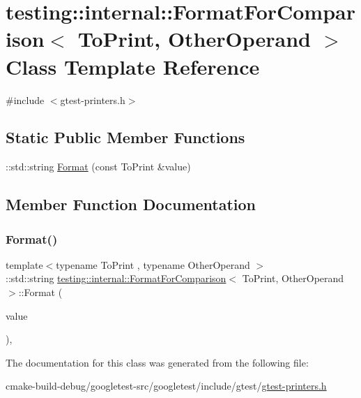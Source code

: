 \hypertarget{classtesting_1_1internal_1_1FormatForComparison}{}\section{testing\+::internal\+::Format\+For\+Comparison$<$ To\+Print, Other\+Operand $>$ Class Template Reference}
\label{classtesting_1_1internal_1_1FormatForComparison}


{\ttfamily \#include $<$gtest-\/printers.\+h$>$}

\subsection*{Static Public Member Functions}
\begin{DoxyCompactItemize}
\item 
\+::std\+::string \mbox{\hyperlink{classtesting_1_1internal_1_1FormatForComparison_a2aeb688fc55b57abd3021d82eccad896}{Format}} (const To\+Print \&value)
\end{DoxyCompactItemize}


\subsection{Member Function Documentation}
\mbox{\label{classtesting_1_1internal_1_1FormatForComparison_a2aeb688fc55b57abd3021d82eccad896}} 
\subsubsection{\texorpdfstring{Format()}{Format()}}
{\footnotesize\ttfamily template$<$typename To\+Print , typename Other\+Operand $>$ \\
\+::std\+::string \mbox{\hyperlink{classtesting_1_1internal_1_1FormatForComparison}{testing\+::internal\+::\+Format\+For\+Comparison}}$<$ To\+Print, Other\+Operand $>$\+::Format (\begin{DoxyParamCaption}\item[{const To\+Print \&}]{value }\end{DoxyParamCaption})\hspace{0.3cm}{\ttfamily [inline]}, {\ttfamily [static]}}



The documentation for this class was generated from the following file\+:\begin{DoxyCompactItemize}
\item 
cmake-\/build-\/debug/googletest-\/src/googletest/include/gtest/\mbox{\hyperlink{gtest-printers_8h}{gtest-\/printers.\+h}}\end{DoxyCompactItemize}
